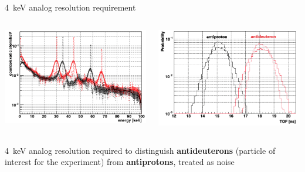 \documentclass[aspectratio=169,xcolor=dvipsnames]{beamer} %
\begin{document}

\begin{frame}{\SI{4}{\kilo\electronvolt} analog resolution requirement}
    \begin{columns}
            \centering
            \includegraphics[height=0.47\textheight]{images/backup_slides/antiproton_antideuteron_1.png}

            \centering
            \includegraphics[height=0.47\textheight]{images/backup_slides/antiproton_antideuteron_2.png}
    \end{columns}

    \vspace{0.5cm}
    \begin{columns}
            \centering
             \SI{4}{\kilo\electronvolt} analog resolution required to distinguish \textbf{antideuterons} (particle of interest for the experiment) from \textbf{antiprotons}, treated as noise
    \end{columns}
\end{frame}
\end{document}
